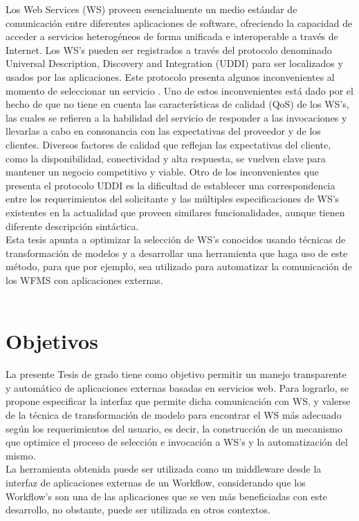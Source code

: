 Los Web Services (WS) proveen esencialmente un medio estándar de comunicación entre diferentes aplicaciones de software, ofreciendo la capacidad de acceder a servicios heterogéneos de forma unificada e interoperable a través de Internet. Los WS's pueden ser registrados a través del protocolo denominado Universal Description, Discovery and Integration (UDDI) para ser localizados y usados por las aplicaciones. Este protocolo presenta algunos inconvenientes al momento de seleccionar un servicio \cite{UDDI}. Uno de estos inconvenientes está dado por el hecho de que no tiene en cuenta las características de calidad (QoS) de los WS's, las cuales se refieren a la habilidad del servicio de responder a las invocaciones y llevarlas a cabo en consonancia con las expectativas del proveedor y de los clientes. Diversos factores de calidad que reflejan las expectativas del cliente, como la disponibilidad, conectividad y alta respuesta, se vuelven clave para mantener un negocio competitivo y viable. Otro de los inconvenientes que presenta el protocolo UDDI es la dificultad de establecer una correspondencia entre los requerimientos del solicitante y las múltiples especificaciones de WS's existentes en la actualidad que proveen similares funcionalidades, aunque tienen diferente descripción sintáctica.\\ 

Esta tesis apunta a optimizar la selección de WS's conocidos usando técnicas de transformación de modelos y a desarrollar una herramienta que haga uso de este método, para que por ejemplo, sea utilizado para automatizar la comunicación de los WFMS con aplicaciones externas.\\\\


\section{Objetivos}
\label{Objetivos}

La presente Tesis de grado tiene como objetivo permitir un manejo transparente y automático de aplicaciones externas basadas en servicios web. Para lograrlo, se propone especificar la interfaz que permite dicha comunicación con WS, y valerse de la técnica de transformación de modelo para encontrar el WS más adecuado según los requerimientos del usuario, es decir, la construcción de un mecanismo que optimice el proceso de selección e invocación a WS’s y la automatización del mismo. \\

La herramienta obtenida puede ser utilizada como un middleware desde la interfaz  de aplicaciones externas de un Workflow, considerando que los Workflow's son una de las aplicaciones que se ven más beneficiadas con este desarrollo, no obstante, puede ser utilizada en otros contextos.\\

